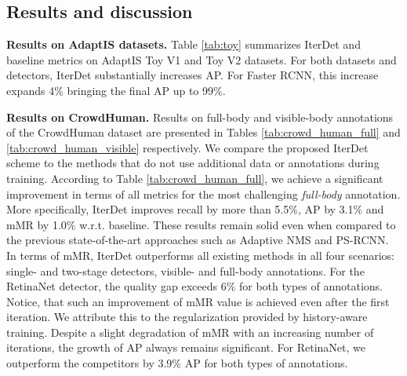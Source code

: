 \documentclass[runningheads]{llncs}
\begin{document}
\subsection{Results and discussion}

\textbf{Results on AdaptIS datasets.} Table \ref{tab:toy} summarizes IterDet and baseline metrics on AdaptIS Toy V1 and Toy V2 datasets. For both datasets and detectors, IterDet substantially increases AP. For Faster RCNN, this increase expands 4\% bringing the final AP up to 99\%.

\textbf{Results on CrowdHuman.} Results on full-body and visible-body annotations of the CrowdHuman dataset are presented in Tables \ref{tab:crowd_human_full} and \ref{tab:crowd_human_visible} respectively. We compare the proposed IterDet scheme to the methods that do not use additional data or annotations during training. According to Table \ref{tab:crowd_human_full}, we achieve a significant improvement in terms of all metrics for the most challenging \emph{full-body} annotation. More specifically, IterDet improves recall by more than 5.5\%, AP by 3.1\% and mMR by 1.0\% w.r.t. baseline. These results remain solid even when compared to the previous state-of-the-art approaches such as Adaptive NMS and PS-RCNN. In terms of mMR, IterDet outperforms all existing methods in all four scenarios: single- and two-stage detectors, visible- and full-body annotations. For the RetinaNet detector, the quality gap exceeds 6\% for both types of annotations. Notice, that such an improvement of mMR value is achieved even after the first iteration. We attribute this to the regularization provided by history-aware training. Despite a slight degradation of mMR with an increasing number of iterations, the growth of AP always remains significant. For RetinaNet, we outperform the competitors by 3.9\% AP for both types of annotations.
\end{document}
